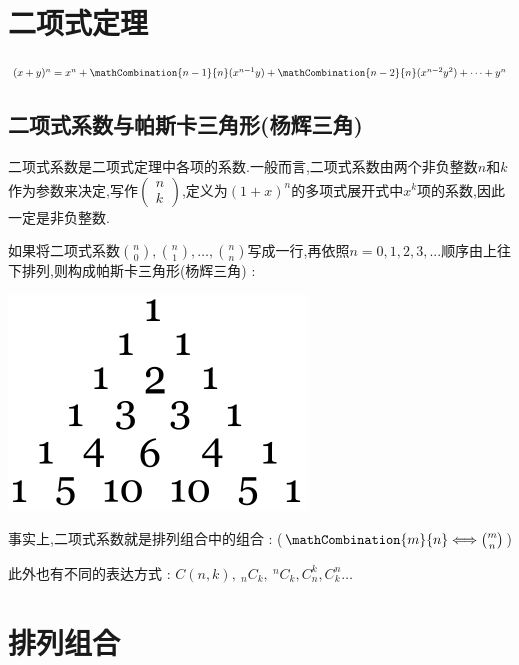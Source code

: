 {\section{二项式定理}{
    $(x + y)^n = x^n + \mathCombination{n - 1}{n}(x^{n-1} y) + \mathCombination{n - 2}{n}(x^{n-2} y^2) + \dots + y^n$

    \subsection{二项式系数与帕斯卡三角形(杨辉三角)}{

        二项式系数是二项式定理中各项的系数.一般而言,二项式系数由两个非负整数$n$和$k$作为参数来决定,写作$\begin{pmatrix}
                n \\
                k
            \end{pmatrix}$,定义为$(1 + x)^n$的多项式展开式中$x^k$项的系数,因此一定是非负整数.

        如果将二项式系数$\binom{n}{0},\binom{n}{1},\dots,\binom{n}{n}$写成一行,再依照$n = 0,1,2,3,...$顺序由上往下排列,则构成帕斯卡三角形(杨辉三角) :
        \begin{center}
            \includegraphics[scale=0.5]{resources/Pascal's_triangle_5.svg.png}
        \end{center}

        事实上,二项式系数就是排列组合中的组合 : ($\mathCombination{m}{n} \Longleftrightarrow \binom{m}{n}$)

        此外也有不同的表达方式 : $C(n,k),~_nC_k,~^nC_k,C^k_n,C^n_k\dots$

    }%

}%

\section{排列组合}{

}}
